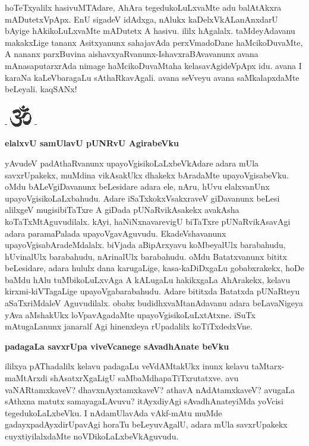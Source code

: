 \noindent
hoTeTxyalilx hasivuMTAdare, AhAra tegedukoLuLxvaMte adu balAtAkxra mADutetxVpApx. EnU sigadeV idAdxga, nAlukx kaDelxVkALanAnxdarU bAyige hAkikoLuLxvaMte mADutetx A hasivu. ililx hAgalalx. taMdeyAdavanu makakxLige tananx Asitxyanunx sahajavAda perxVmadoDane haMcikoDuvaMte, A nananx parxBuvina aishavxyaRvanunx-IshavxraBAvavanunx avana mAnasaputarxrAda nimage haMcikoDuvaMtaha kelasavAgideVpApx idu. avana I karaNa kaLeVbaragaLu sAthaRkavAgali. avana seVveyu avana saMkalapxdaMte beLeyali. kaqSANx!

\newpage

\begin{center}
- \includegraphics{om.eps} -
\end{center}

{\bigskip
\noindent
{\large\bf elalxvU samUlavU pUNRvU AgirabeVku}}\label{page190b}
\medskip

\noindent
yAvudeV padAthaRvanunx upayoVgisikoLaLxbeVkAdare adara mUla savxrUpakekx, muMdina vikAsakUkx dhakekx bAradaMte upayoVgisabeVku. oMdu bALeVgiDavanunx beLesidare adara ele, nAru, hUvu elalxvanUnx upayoVgisikoLaLxbahudu. Adare iSaTxkokxVsakxraveV giDavanunx beLesi alilxgeV mugisibiTaTxre A giDada pUNaRvikAsakekx avakAsha koTaTxMtAguvudilalx. kAyi, haNiNxnavarevigU biTaTxre pUNaRvikAsavAgi adara paramaPalada upayoVgavAguvudu. EkadeVshavanunx upayoVgisabAradeMdalalx. biVjada aBipArxyavu koMbeyalUlx barabahudu, hUvinalUlx barabahudu, nArinalUlx barabahudu. oMdu Batatxvanunx bititx beLesidare, adara hululx dana karugaLige, kasa-kaDiDxgaLu gobabxrakekx, hoDe baMdu hAlu tuMbikoLuLxvAga A kALugaLu hakikxgaLa AhArakekx, kelavu kirxmi-kiVTagaLige upayoVgabarabahudu. Adare bititxda Batatxda pUNaRteyu aSaTxriMdaleV Aguvudilalx. obabx budidhxvaMtanAdavanu adara beLavaNigeya yAva aMshakUkx loVpavAgadaMte upayoVgisikoLuLxtAtxne. iSuTx mAtugaLanunx janaralf Agi hinenxleya rUpadalilx koTiTxdedxVne.

\eject

{\bigskip
\noindent
{\large\bf padagaLa savxrUpa viveVcanege sAvadhAnate beVku}}\label{page191}
\medskip

\noindent
ililxya pAThadalilx kelavu padagaLu veVdAMtakUkx inunx kelavu taMtarx-maMtArxdi shAsatxrXgaLigU saMbaMdhapaTiTxrutatxve. avu vaNARtamxkaveV? dhavxnAyxtamxkaveV? athavA nAdAtamxkaveV? avugaLa sAthxna matutx samayagaLAvuvu? itAyxdiyAgi sAvadhAnateyiMda yoVcisi tegedukoLaLxbeVku. I nAdamUlavAda vAkf-mAtu muMde gadayxpadAyxdirUpavAgi horaTu beLeyuvAgalU, adara mUla savxrUpakekx cuyxtiyilalxdaMte noVDikoLaLxbeVkAguvudu.

